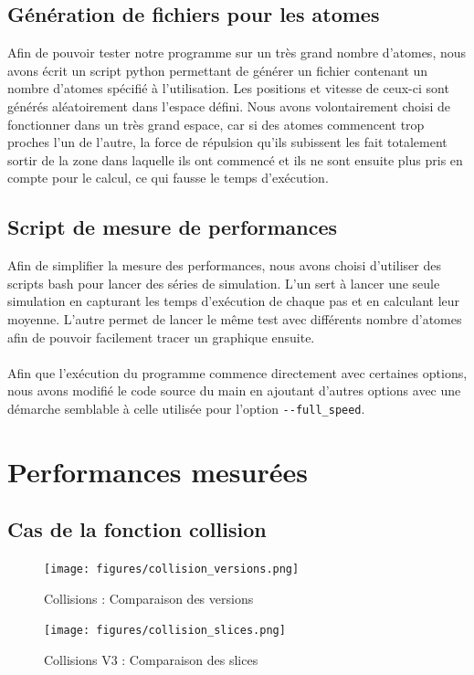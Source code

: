 \documentclass{article}
\begin{document}
\subsection{Génération de fichiers pour les atomes}
Afin de pouvoir tester notre programme sur un très grand nombre d'atomes, nous
avons écrit un script python permettant de générer un fichier contenant un
nombre d'atomes spécifié à l'utilisation. Les positions et vitesse de ceux-ci
sont générés aléatoirement dans l'espace défini. Nous avons volontairement
choisi de fonctionner dans un très grand espace, car si des atomes commencent
trop proches l'un de l'autre, la force de répulsion qu'ils subissent les fait
totalement sortir de la zone dans laquelle ils ont commencé et ils ne sont
ensuite plus pris en compte pour le calcul, ce qui fausse le temps d'exécution.

\subsection{Script de mesure de performances}
Afin de simplifier la mesure des performances, nous avons choisi d'utiliser des
scripts bash pour lancer des séries de simulation. L'un sert à lancer une seule
simulation en capturant les temps d'exécution de chaque pas et en calculant leur
moyenne. L'autre permet de lancer le même test avec différents nombre d'atomes
afin de pouvoir facilement tracer un graphique ensuite.
\paragraph{}
Afin que l'exécution du programme commence directement avec certaines options,
nous avons modifié le code source du main en ajoutant d'autres options avec une
démarche semblable à celle utilisée pour l'option \verb!--full_speed!.

\section{Performances mesurées}

\subsection{Cas de la fonction collision}
\begin{figure}[ht]
	\caption{Collisions : Comparaison des versions}
	\label{collisions-versions}
	\texttt{[image: figures/collision\_versions.png]}
\end{figure}
\begin{figure}[ht]
	\caption{Collisions V3 : Comparaison des slices}
	\label{collisions-slices}
	\texttt{[image: figures/collision\_slices.png]}
\end{figure}
\end{document}
